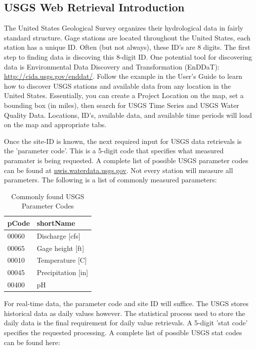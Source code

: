\documentclass[a4paper,11pt]{article}
\begin{document}
\subsection{USGS Web Retrieval Introduction}
The United States Geological Survey organizes their hydrological data in fairly standard structure.  Gage stations are located throughout the United States, each station has a unique ID.  Often (but not always), these ID's are 8 digits.  The first step to finding data is discoving this 8-digit ID. One potential tool for discovering data is Environmental Data Discovery and Transformation (EnDDaT): \url{http://cida.usgs.gov/enddat/}.  Follow the example in the User's Guide to learn how to discover USGS stations and available data from any location in the United States. Essentially, you can create a Project Location on the map, set a bounding box (in miles), then search for USGS Time Series and USGS Water Quality Data. Locations, ID's, available data, and available time periods will load on the map and appropriate tabs.

Once the site-ID is known, the next required input for USGS data retrievals is the 'parameter code'.  This is a 5-digit code that specifies what measured paramater is being requested.  A complete list of possible USGS parameter codes can be found at \href{http://nwis.waterdata.usgs.gov/usa/nwis/pmcodes?radio_pm_search=param_group&pm_group=All+--+include+all+parameter+groups&pm_search=&casrn_search=&srsname_search=&format=html_table&show=parameter_group_nm&show=parameter_nm&show=casrn&show=srsname&show=parameter_units}{nwis.waterdata.usgs.gov}. Not every station will measure all parameters. The following is a list of commonly measured parameters:



\begin{table}[ht]
\begin{center}
\caption{Commonly found USGS Parameter Codes}
\begin{tabular}{ll}
  \hline
pCode & shortName \\ 
  \hline
00060 & Discharge [cfs] \\ 
  00065 & Gage height [ft] \\ 
  00010 & Temperature [C] \\ 
  00045 & Precipitation [in] \\ 
  00400 & pH \\ 
   \hline
\end{tabular}
\end{center}
\end{table}
For real-time data, the parameter code and site ID will suffice.  The USGS stores historical data as daily values however.  The statistical process used to store the daily data is the final requirement for daily value retrievals.  A 5-digit 'stat code' specifies the requested processing.  A complete list of possible USGS stat codes can be found here:
\end{document}
